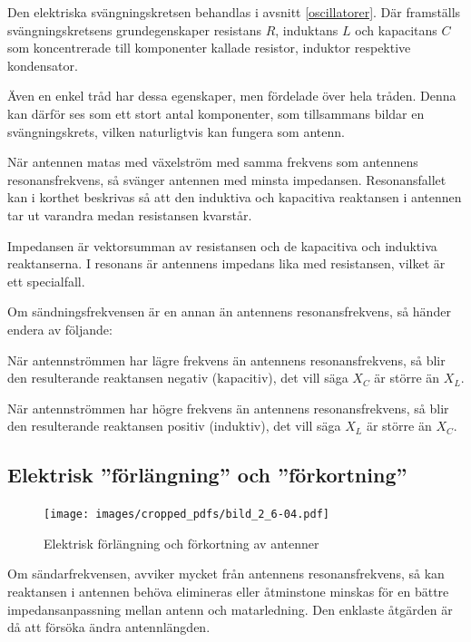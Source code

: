 Den elektriska svängningskretsen behandlas i avsnitt \ref{oscillatorer}.
Där framställs svängningskretsens grundegenskaper resistans \(R\),
induktans \(L\) och kapacitans \(C\) som koncentrerade till komponenter kallade
resistor, induktor respektive kondensator.

Även en enkel tråd har dessa egenskaper, men fördelade över hela tråden.
Denna kan därför ses som ett stort antal komponenter, som tillsammans bildar en
svängningskrets, vilken naturligtvis kan fungera som antenn.

När antennen matas med växelström med samma frekvens som antennens
resonansfrekvens, så svänger antennen med minsta impedansen.
Resonansfallet kan i korthet beskrivas så att den induktiva och kapacitiva
reaktansen i antennen tar ut varandra medan resistansen kvarstår.

Impedansen är vektorsumman av resistansen och de kapacitiva och
induktiva reaktanserna.
I resonans är antennens impedans lika med resistansen, vilket är ett
specialfall.

Om sändningsfrekvensen är en annan än antennens resonansfrekvens, så händer
endera av följande:

När antennströmmen har lägre frekvens än antennens resonansfrekvens, så blir
den resulterande reaktansen negativ (kapacitiv), det vill säga \(X_C\) är större
än \(X_L\).

När antennströmmen har högre frekvens än antennens resonansfrekvens,
så blir den resulterande reaktansen positiv (induktiv), det vill säga \(X_L\)
är större än \(X_C\).

\subsection{Elektrisk ''förlängning'' och ''förkortning''}
\label{elektrisk förlängning}

\begin{figure}
  \texttt{[image: images/cropped\_pdfs/bild\_2\_6-04.pdf]}
  \caption{Elektrisk förlängning och förkortning av antenner}
  \label{fig:bildII6-4}
\end{figure}

Om sändarfrekvensen, avviker mycket från antennens resonansfrekvens,
så kan reaktansen i antennen behöva elimineras eller åtminstone
minskas för en bättre impedansanpassning mellan antenn och matarledning.
Den enklaste åtgärden är då att försöka ändra antennlängden.

